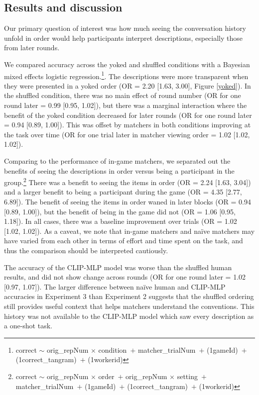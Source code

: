 \documentclass[10pt, letterpaper]{article}
\begin{document}
\subsection{Results and discussion}\label{results-and-discussion-1}

Our primary question of interest was how much seeing the conversation
history unfold in order would help participants interpret descriptions,
especially those from later rounds.

We compared accuracy across the yoked and shuffled conditions with a
Bayesian mixed effects logistic regression.\footnote{correct \({\sim}\)
  orig\_repNum \({\times}\) condition~\({+}\) matcher\_trialNum~\({+}\)
  (1\textbar gameId)~\({+}\) (1\textbar correct\_tangram)~\({+}\)
  (1\textbar workerid)}. The descriptions were more transparent when
they were presented in a yoked order (OR = 2.20 {[}1.63, 3.00{]}, Figure
\ref{yoked}). In the shuffled condition, there was no main effect of
round number (OR for one round later = 0.99 {[}0.95, 1.02{]}), but there
was a marginal interaction where the benefit of the yoked condition
decreased for later rounds (OR for one round later = 0.94 {[}0.89,
1.00{]}). This was offset by matchers in both conditions improving at
the task over time (OR for one trial later in matcher viewing order =
1.02 {[}1.02, 1.02{]}).

Comparing to the performance of in-game matchers, we separated out the
benefits of seeing the descriptions in order versus being a participant
in the group.\footnote{correct \({\sim}\) orig\_repNum \({\times}\)
  order~\({+}\) orig\_repNum \({\times}\) setting~\({+}\)
  matcher\_trialNum~\({+}\) (1\textbar gameId)~\({+}\)
  (1\textbar correct\_tangram)~\({+}\) (1\textbar workerid)} There was a
benefit to seeing the items in order (OR = 2.24 {[}1.63, 3.04{]}) and a
larger benefit to being a participant during the game (OR = 4.35
{[}2.77, 6.89{]}). The benefit of seeing the items in order waned in
later blocks (OR = 0.94 {[}0.89, 1.00{]}), but the benefit of being in
the game did not (OR = 1.06 {[}0.95, 1.18{]}). In all cases, there was a
baseline improvement over trials (OR = 1.02 {[}1.02, 1.02{]}). As a
caveat, we note that in-game matchers and naïve matchers may have varied
from each other in terms of effort and time spent on the task, and thus
the comparison should be interpreted cautiously.

The accuracy of the CLIP-MLP model was worse than the shuffled human
results, and did not show change across rounds (OR for one round later =
1.02 {[}0.97, 1.07{]}). The larger difference between naïve human and
CLIP-MLP accuracies in Experiment 3 than Experiment 2 suggests that the
shuffled ordering still provides useful context that helps matchers
understand the conventions. This history was not available to the
CLIP-MLP model which saw every description as a one-shot task.
\end{document}

